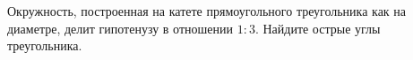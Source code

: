 \begin{ex}
	\begin{condition}
		Окружность, построенная на катете прямоугольного треугольника как на диаметре, делит гипотенузу в отношении \( 1 : 3  \). Найдите острые углы треугольника.
	\end{condition}
\end{ex}